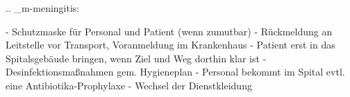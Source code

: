 
.. _m-meningitis:


\begin{itemize}
  -   Schutzmaske für Personal und Patient (wenn zumutbar)
  -   Rückmeldung an Leitstelle vor Transport, Voranmeldung im Krankenhaus
  -   Patient erst in das Spitalsgebäude bringen, wenn
  Ziel und Weg dorthin klar ist
  -   Desinfektionsmaßnahmen gem. Hygieneplan
  -   Personal bekommt im Spital evtl. eine Antibiotika-Prophylaxe
  -   Wechsel der Dienstkleidung
\end{itemize}